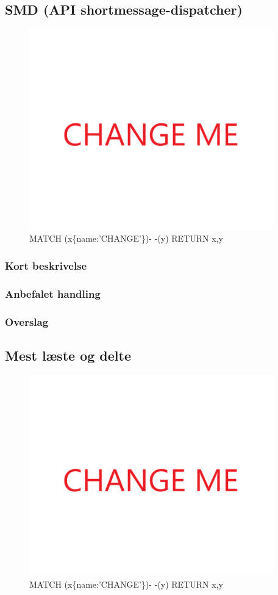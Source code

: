 \documentclass{article}
\begin{document}
\subsection{SMD (API shortmessage-dispatcher)}
\begin{figure}[h]
\includegraphics[width=300pt]{CHANGE.PNG}
\caption{MATCH (x\{name:'CHANGE'\})- -(y) RETURN x,y}
\end{figure}
\subsubsection{Kort beskrivelse}
\subsubsection{Anbefalet handling}
\subsubsection{Overslag}
\subsection{Mest læste og delte}
\begin{figure}[h]
\includegraphics[width=300pt]{CHANGE.PNG}
\caption{MATCH (x\{name:'CHANGE'\})- -(y) RETURN x,y}
\end{figure}
\end{document}
